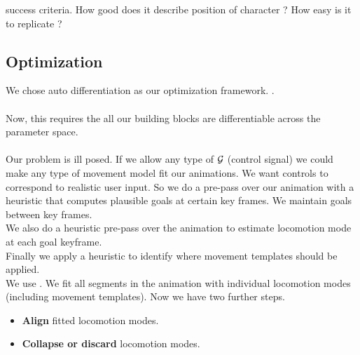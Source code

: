success criteria. How good does it describe position of character ? How easy is it to replicate ?


\subsection{Optimization}
We chose auto differentiation as our optimization framework. . 
\\\\
Now, this requires the all our building blocks are differentiable across the parameter space.
\\\\ 
Our problem is ill posed. If we allow any type of $\mathcal{G}$ (control signal) we could make any type of movement model fit our animations. We want controls to correspond to realistic user input. So we do a pre-pass over our animation  with a heuristic that computes plausible goals at certain key frames. We maintain goals between key frames.
\\

We also do a heuristic pre-pass over the animation to estimate locomotion mode at each goal keyframe.
\\
Finally we apply a heuristic to identify where movement templates should be applied.
\\
We use . We fit all segments in the animation with individual  locomotion modes (including movement templates).
Now we have two further steps.
\begin{itemize}
    \item \textbf{Align} fitted locomotion modes. 
    \item \textbf{Collapse or discard} locomotion modes.
\end{itemize}



